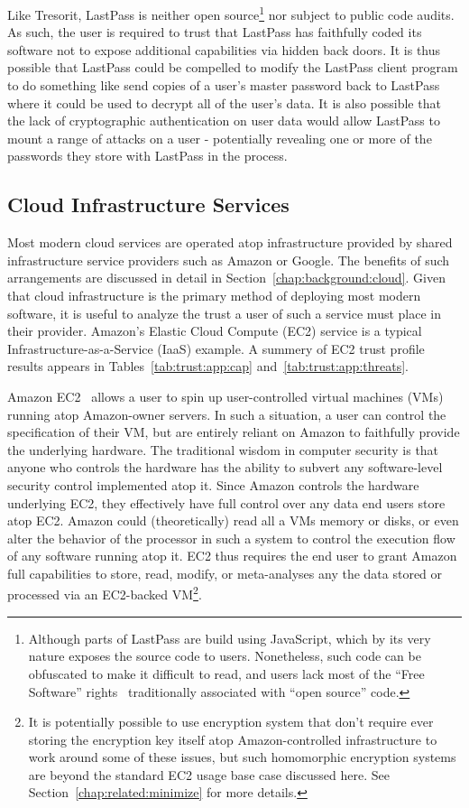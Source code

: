 Like Tresorit, LastPass is neither open source\footnote{Although parts
  of LastPass are build using JavaScript, which by its very nature
  exposes the source code to users. Nonetheless, such code can be
  obfuscated to make it difficult to read, and users lack most of the
  ``Free Software'' rights~\cite{fsf-freedoms} traditionally
  associated with ``open source'' code.} nor subject to public code
audits. As such, the user is required to trust that LastPass has
faithfully coded its software not to expose additional capabilities
via hidden back doors. It is thus possible that LastPass could be
compelled to modify the LastPass client program to do something like
send copies of a user's master password back to LastPass where it
could be used to decrypt all of the user's data. It is also possible
that the lack of cryptographic authentication on user data would allow
LastPass to mount a range of attacks on a user - potentially revealing
one or more of the passwords they store with LastPass in the process.

\subsection{Cloud Infrastructure Services}

Most modern cloud services are operated atop infrastructure provided
by shared infrastructure service providers such as Amazon or
Google. The benefits of such arrangements are discussed in detail in
Section~\ref{chap:background:cloud}. Given that cloud infrastructure
is the primary method of deploying most modern software, it is useful
to analyze the trust a user of such a service must place in their
provider. Amazon's Elastic Cloud Compute (EC2) service is a typical
Infrastructure-as-a-Service (IaaS) example. A summery of EC2 trust
profile results appears in Tables~\ref{tab:trust:app:cap}
and~\ref{tab:trust:app:threats}.

Amazon EC2~\cite{amazon-ec2} allows a user to spin up user-controlled
virtual machines (VMs) running atop Amazon-owner servers. In such a
situation, a user can control the specification of their VM, but are
entirely reliant on Amazon to faithfully provide the underlying
hardware. The traditional wisdom in computer security is that anyone
who controls the hardware has the ability to subvert any
software-level security control implemented atop it. Since Amazon
controls the hardware underlying EC2, they effectively have full
control over any data end users store atop EC2. Amazon could
(theoretically) read all a VMs memory or disks, or even alter the
behavior of the processor in such a system to control the execution
flow of any software running atop it. EC2 thus requires the end user
to grant Amazon full capabilities to store, read, modify, or
meta-analyses any the data stored or processed via an EC2-backed
VM\footnote{It is potentially possible to use encryption system that
  don't require ever storing the encryption key itself atop
  Amazon-controlled infrastructure to work around some of these
  issues, but such homomorphic encryption systems are beyond the
  standard EC2 usage base case discussed here. See
  Section~\ref{chap:related:minimize} for more details.}.

